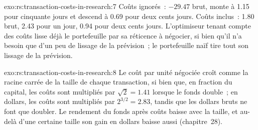 \begin{solution}{exo:rs:transaction-costs-in-research:7}
Coûts ignorés~: $-29.47$ brut, monte à 1.15 pour cinquante jours et descend à 0.69 pour deux cents jours. Coûts inclus~: 1.80 brut, 2.43 pour un jour, 0.94 pour deux cents jours.
L'optimiseur tenant compte des coûts lisse déjà le portefeuille par sa réticence à négocier, si bien qu'il n'a besoin que d'un peu de lissage de la prévision~; le portefeuille naïf tire tout son
lissage de la prévision.
\end{solution}

\begin{solution}{exo:rs:transaction-costs-in-research:8}
Le coût par unité négociée croît comme la racine carrée de la taille de chaque transaction, si bien que, en fraction du capital, les coûts sont multipliés par $\sqrt 2 = 1.41$ lorsque le fonds
double~; en dollars, les coûts sont multipliés par $2^{3/2} = 2.83$, tandis que les dollars bruts ne font que doubler. Le rendement du fonds après coûts baisse avec la taille, et au-delà d'une certaine taille son
gain en dollars baisse aussi (chapitre~28).
\end{solution}

